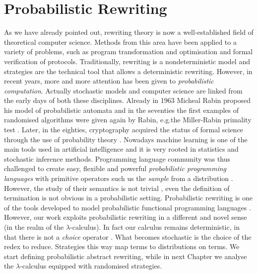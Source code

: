 \chapter{Probabilistic Rewriting}\label{ch:mathtest} %
As we have already pointed out, rewriting theory is now a well-established field of theoretical computer science. Methods from this area have been applied to a variety of problems, such as program transformation and optimisation and formal verification of protocols. Traditionally, rewriting is a nondeterministic model and strategies are the technical tool that allows a deterministic rewriting. However, in recent years, more and more attention has been given to \emph{probabilistic computation}. Actually stochastic models and computer science are linked from the early days of both these disciplines. Already in 1963 Micheal Rabin proposed his model of probabilistic automata \cite{} and in the seventies the first examples of randomised algorithms were given again by Rabin, e.g.the Miller-Rabin primality test \cite{}. Later, in the eighties, cryptography acquired the status of formal science through the use of probability theory \cite{}. Nowadays machine learning is one of the main tools used in artificial intelligence and it is very rooted in statistics and stochastic inference methods. Programming language community was thus challenged to create easy, flexible and powerful \emph{probabilistic programming languages} with primitive operators such us the \emph{sample} from a distribution \cite{}. However, the study of their semantics is not trivial \cite{}, even the definition of termination is not obvious in a probabilistic setting. Probabilistic rewriting is one of the tools developed to model  probabilistic functional programming languages \cite{}. However, our work exploits probabilistic rewriting in a different and novel sense (in the realm of the $\lambda$-calculus). In fact our calculus remains deterministic, in that there is not a \emph{choice} operator \cite{}. What becomes stochastic is the choice of the redex to reduce. Strategies this way map terms to distributions on terms. We start defining probabilistic abstract rewriting, while in next Chapter we analyse the $\lambda$-calculus equipped with randomised strategies.
